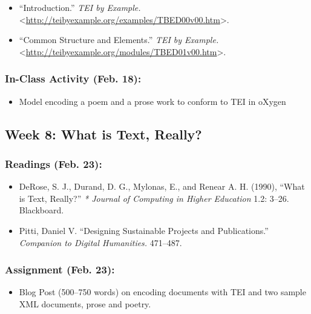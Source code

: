 \documentclass[]{article}
\begin{document}
\begin{itemize}
\itemsep1pt\parskip0pt
\item
  ``Introduction.'' \emph{TEI by Example.}
  \textless{}\url{http://teibyexample.org/examples/TBED00v00.htm}\textgreater{}.
\item
  ``Common Structure and Elements.'' \emph{TEI by Example.}
  \textless{}\url{http://teibyexample.org/modules/TBED01v00.htm}\textgreater{}.
\end{itemize}

\subsubsection{In-Class Activity (Feb.
18):}\label{in-class-activity-feb.-18}

\begin{itemize}
\itemsep1pt\parskip0pt
\item
  Model encoding a poem and a prose work to conform to TEI in oXygen
\end{itemize}

\subsection{Week 8: What is Text,
Really?}\label{week-8-what-is-text-really}

\subsubsection{Readings (Feb. 23):}\label{readings-feb.-23}

\begin{itemize}
\itemsep1pt\parskip0pt
\item
  DeRose, S. J., Durand, D. G., Mylonas, E., and Renear A. H. (1990),
  ``What is Text, Really?'' \emph{* Journal of Computing in Higher
  Education} 1.2: 3--26. Blackboard.
\item
  Pitti, Daniel V. ``Designing Sustainable Projects and Publications.''
  \emph{Companion to Digital Humanities.} 471--487.
\end{itemize}

\subsubsection{Assignment (Feb. 23):}\label{assignment-feb.-23}

\begin{itemize}
\itemsep1pt\parskip0pt
\item
  Blog Post (500--750 words) on encoding documents with TEI and two
  sample XML documents, prose and poetry.
\end{itemize}
\end{document}
